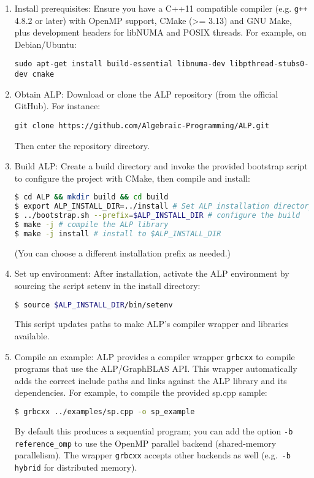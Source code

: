 \begin{enumerate}
\item Install prerequisites: Ensure you have a C++11 compatible compiler (e.g. \texttt{g++} 4.8.2 or later) with OpenMP support, CMake (>= 3.13) and GNU Make, plus development headers for libNUMA and POSIX threads. 
For example, on Debian/Ubuntu:
\begin{verbatim}
sudo apt-get install build-essential libnuma-dev libpthread-stubs0-dev cmake
\end{verbatim}

\item Obtain ALP: Download or clone the ALP repository (from the official GitHub). For instance:
\begin{verbatim}
git clone https://github.com/Algebraic-Programming/ALP.git
\end{verbatim}
Then enter the repository directory.

\item Build ALP: Create a build directory and invoke the provided bootstrap script to configure the project with CMake, then compile and install:
\begin{lstlisting}[language=bash, basicstyle=\ttfamily\small, showstringspaces=false]
$ cd ALP && mkdir build && cd build
$ export ALP_INSTALL_DIR=../install # Set ALP installation directory
$ ../bootstrap.sh --prefix=$ALP_INSTALL_DIR # configure the build
$ make -j # compile the ALP library
$ make -j install # install to $ALP_INSTALL_DIR
\end{lstlisting}
(You can choose a different installation prefix as needed.)

\item Set up environment: After installation, activate the ALP environment by sourcing the script setenv in the install directory:
\begin{lstlisting}[language=bash, basicstyle=\ttfamily\small, showstringspaces=false]
$ source $ALP_INSTALL_DIR/bin/setenv
\end{lstlisting}
This script updates paths to make ALP's compiler wrapper and libraries available.

\item Compile an example: ALP provides a compiler wrapper \texttt{grbcxx} to compile programs that use the ALP/GraphBLAS API. This wrapper automatically adds the correct include paths and links against the ALP library and its dependencies. For example, to compile the provided sp.cpp sample:
\begin{lstlisting}[language=bash, basicstyle=\ttfamily\small, showstringspaces=false]
$ grbcxx ../examples/sp.cpp -o sp_example
\end{lstlisting}
By default this produces a sequential program; you can add the option \texttt{-b reference\_omp} to use the OpenMP parallel backend (shared-memory parallelism). The wrapper \texttt{grbcxx} accepts other backends as well (e.g.\ \texttt{-b hybrid} for distributed memory).


\end{enumerate}

